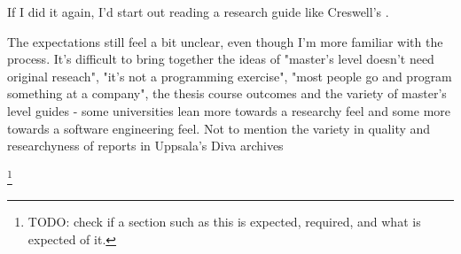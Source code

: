 \documentclass[a4paper]{report}
\newcommand{\todo}[1]{\footnote{{\color{red} TODO: #1}}}
\begin{document}
If I did it again, I'd start out reading a research guide like Creswell's \cite{creswell2003research}.

The expectations still feel a bit unclear, even though I'm more familiar with the process. It's difficult to bring together the ideas of "master's level doesn't need original reseach", "it's not a programming exercise", "most people go and program something at a company", the thesis course outcomes and the variety of master's level guides - some universities lean more towards a researchy feel and some more towards a software engineering feel. Not to mention the variety in quality and researchyness of reports in Uppsala's Diva archives

\todo{check if a section such as this is expected, required, and what is expected of it.}

\clearpage



\end{document}
